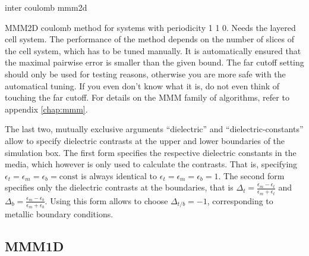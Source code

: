 \begin{essyntax}
 inter coulomb  mmm2d 
  \begin{features}
  \end{features}
\end{essyntax}
MMM2D coulomb method for systems with periodicity 1 1 0. Needs the
layered cell system. The performance of the method depends on the
number of slices of the cell system, which has to be tuned manually.
It is automatically ensured that the maximal pairwise error is smaller
than the given bound. The far cutoff setting should only be used for
testing reasons, otherwise you are more safe with the automatical
tuning. If you even don't know what it is, do not even think of
touching the far cutoff. For details on the MMM family of algorithms,
refer to appendix \vref{chap:mmm}.

The last two, mutually exclusive arguments ``dielectric'' and
``dielectric-constants'' allow to specify dielectric contrasts at the
upper and lower boundaries of the simulation box. The first form
specifies the respective dielectric constants in the media, which
however is only used to calculate the contrasts. That is, specifying 
$\epsilon_t=\epsilon_m=\epsilon_b=\text{const}$ is always identical to
$\epsilon_t=\epsilon_m=\epsilon_b=1$. The second form specifies only
the dielectric contrasts at the boundaries, that is
$\Delta_t=\frac{\epsilon_m-\epsilon_t}{\epsilon_m+\epsilon_t}$ and
$\Delta_b=\frac{\epsilon_m-\epsilon_b}{\epsilon_m+\epsilon_b}$. Using
this form allows to choose $\Delta_{t/b}=-1$, corresponding to
metallic boundary conditions.

\subsection{MMM1D}

